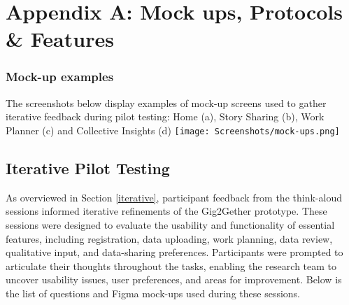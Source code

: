 \appendix
\section{Appendix A: Mock ups, Protocols \& Features }
\begin{figure*}[h!]  %
\subsubsection{Mock-up examples}\label{A.1.1}
The screenshots below display examples of mock-up screens used to gather iterative feedback during pilot testing: Home (a), Story Sharing (b), Work Planner (c) and Collective Insights (d)
    \centering
    \texttt{[image: Screenshots/mock-ups.png]}
    \label{mock-ups}
\end{figure*}
\subsection{Iterative Pilot Testing}
As overviewed in Section \ref{iterative}, participant feedback from the think-aloud sessions informed iterative refinements of the Gig2Gether prototype. These sessions were designed to evaluate the usability and functionality of essential features, including registration, data uploading, work planning, data review, qualitative input, and data-sharing preferences. Participants were prompted to articulate their thoughts throughout the tasks, enabling the research team to uncover usability issues, user preferences, and areas for improvement. Below is the list of questions and Figma mock-ups used during these sessions.
